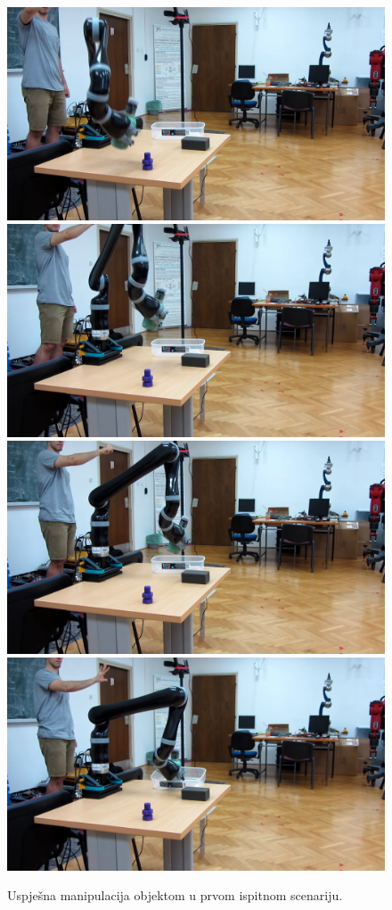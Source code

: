 \documentclass[times, utf8, diplomski, numeric]{fer}
\begin{document}
\begin{figure}[H]
    \centering
    \includegraphics[width=0.48\columnwidth]{video1_2}
    \includegraphics[width=0.48\columnwidth]{video2_2}
    \includegraphics[width=0.48\columnwidth]{video3_2}
    \includegraphics[width=0.48\columnwidth]{video4_2}
	\caption{Uspješna manipulacija objektom u prvom ispitnom scenariju.}
	\label{fig:successful_grasp_1}
\end{figure}
\end{document}
